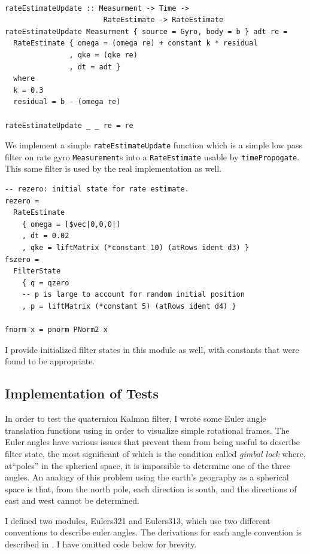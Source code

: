 \documentclass[12pt]{report}
\begin{document}
\begin{lstlisting}

rateEstimateUpdate :: Measurment -> Time -> 
                       RateEstimate -> RateEstimate
rateEstimateUpdate Measurment { source = Gyro, body = b } adt re = 
  RateEstimate { omega = (omega re) + constant k * residual
               , qke = (qke re)
               , dt = adt }
  where 
  k = 0.3
  residual = b - (omega re)

rateEstimateUpdate _ _ re = re 
\end{lstlisting}
We implement a simple \lstinline$rateEstimateUpdate$ function which is a simple low pass filter on rate gyro \lstinline$Measurement$s into a \lstinline$RateEstimate$ usable by \lstinline$timePropogate$. This same filter is used by the real implementation as well.
\begin{lstlisting}
-- rezero: initial state for rate estimate. 
rezero = 
  RateEstimate 
    { omega = [$vec|0,0,0|]
    , dt = 0.02
    , qke = liftMatrix (*constant 10) (atRows ident d3) }
fszero = 
  FilterState 
    { q = qzero
    -- p is large to account for random initial position
    , p = liftMatrix (*constant 5) (atRows ident d4) }

fnorm x = pnorm PNorm2 x
\end{lstlisting}
I provide initialized filter states in this module as well, with constants that were found to be appropriate.

\subsection{Implementation of Tests}
In order to test the quaternion Kalman filter, I wrote some Euler angle translation functions using \cite{deibel06} in order to visualize simple rotational frames. The Euler angles have various issues that prevent them from being useful to describe filter state, the most significant of which is the condition called \emph{gimbal lock} where, at``poles'' in the spherical space, it is impossible to determine one of the three angles. An analogy of this problem using the earth's geography as a spherical space is that, from the north pole, each direction is south, and the directions of east and west cannot be determined.

I defined two modules, Eulers321 and Eulers313, which use two different conventions to describe euler angles. The derivations for each angle convention is described in \cite{deibel06}. I have omitted code below for brevity.
\end{document}
